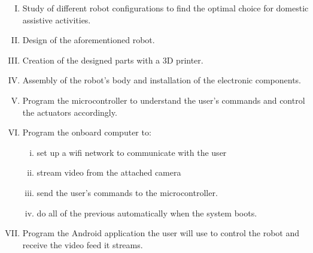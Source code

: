 	\begin{enumerate}[I.]

		\item Study of different robot configurations to find the optimal choice for domestic assistive activities.\\

		\item Design of the aforementioned robot.\\

		\item Creation of the designed parts with a 3D printer.\\

		\item Assembly of the robot's body and installation of the electronic components.\\

		\item Program the microcontroller to understand the user's commands and control the actuators accordingly.\\

		\item Program the onboard computer to: 
			\begin{enumerate}[i.] 
			\item set up a wifi network to communicate with the user
			\item stream video from the attached camera 
			\item send the user's commands to the microcontroller.
			\item do all of the previous automatically when the system boots.\\
			\end{enumerate}

	
		\item Program the Android application the user will use to control the robot and receive the video feed it streams.

	\end{enumerate}






